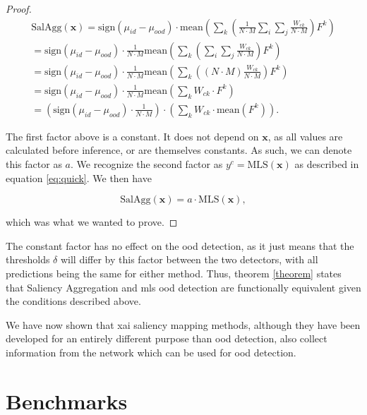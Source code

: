 \documentclass[UKenglish]{uiomasterthesis} %
\theoremstyle{definition}
\begin{document}
\begin{proof}
\begin{gather}
    \text{SalAgg}(\bm{x}) = \text{sign}(\mu_{id} - \mu_{ood}) \cdot \text{mean} \left(\sum_k \left( \frac{1}{N \cdot M} \sum_i \sum_j \frac{W_{ck}}{N \cdot M} \right) F^k \right) \\
    = \text{sign}(\mu_{id} - \mu_{ood}) \cdot \frac{1}{N \cdot M} \text{mean} \left(\sum_k \left(  \sum_i \sum_j \frac{W_{ck}}{N \cdot M}  \right) F^k \right) \\
    = \text{sign}(\mu_{id} - \mu_{ood}) \cdot \frac{1}{N \cdot M} \text{mean} \left(\sum_k \left( (N \cdot M) \frac{W_{ck}}{N \cdot M} \right) F^k \right) \\
    = \text{sign}(\mu_{id} - \mu_{ood}) \cdot \frac{1}{N \cdot M} \text{mean} \left(\sum_k  W_{ck} \cdot F^k \right) \\
    = \left(\text{sign}(\mu_{id} - \mu_{ood}) \cdot \frac{1}{N \cdot M} \right) \cdot \left( \sum_k  W_{ck} \cdot \text{mean}(F^k) \right).
\end{gather}


The first factor above is a constant. It does not depend on $\bm{x}$, as all values are calculated before inference, or are themselves constants. As such, we can denote this factor as $a$. We recognize the second factor as $y^c = \text{MLS}(\bm{x})$ as described in equation \ref{eq:quick}. We then have

\begin{equation}
    \text{SalAgg}(\bm{x}) = a \cdot \text{MLS}(\bm{x}),
\end{equation}

which was what we wanted to prove.

\end{proof}

The constant factor has no effect on the \ac{ood} detection, as it just means that the thresholds $\delta$ will differ by this factor between the two detectors, with all predictions being the same for either method. Thus, theorem \ref{theorem} states that Saliency Aggregation and \ac{mls} \ac{ood} detection are functionally equivalent given the conditions described above.

We have now shown that \ac{xai} saliency mapping methods, although they have been developed for an entirely different purpose than \ac{ood} detection, also collect information from the network which can be used for \ac{ood} detection.

\section{Benchmarks} \label{section:benchmarks}
\end{document}
